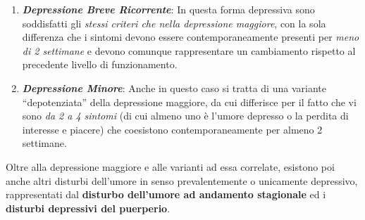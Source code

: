 \documentclass[]{article}
\begin{document}
\begin{enumerate}
\def\labelenumi{\arabic{enumi}.}
\item
  \textbf{\emph{Depressione Breve Ricorrente}}: In questa forma
  depressiva sono soddisfatti gli \emph{stessi criteri che nella
  depressione maggiore}, con la sola differenza che i sintomi devono
  essere contemporaneamente presenti per \emph{meno di 2 settimane} e
  devono comunque rappresentare un cambiamento rispetto al precedente
  livello di funzionamento.
\item
  \textbf{\emph{Depressione Minore}}: Anche in questo caso si tratta di
  una variante ``depotenziata'' della depressione maggiore, da cui
  differisce per il fatto che vi sono \emph{da 2 a 4 sintomi} (di cui
  almeno uno è l'umore depresso o la perdita di interesse e piacere) che
  coesistono contemporaneamente per almeno 2 settimane.
\end{enumerate}

Oltre alla depressione maggiore e alle varianti ad essa correlate,
esistono poi anche altri disturbi dell'umore in senso prevalentemente o
unicamente depressivo, rappresentati dal \textbf{disturbo dell'umore ad
andamento stagionale} ed i \textbf{disturbi depressivi del puerperio}.
\end{document}
